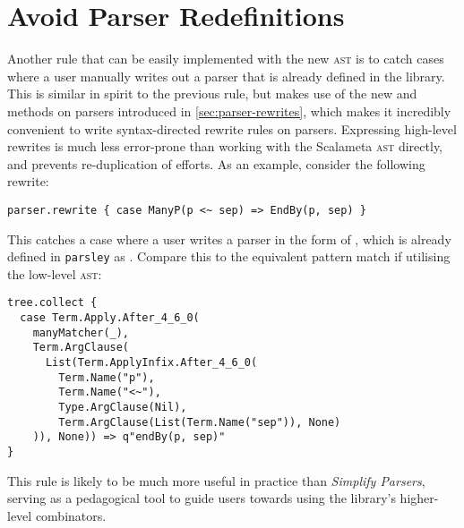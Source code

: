 \documentclass[../../main.tex]{subfiles}
\begin{document}
\section{Avoid Parser Redefinitions}\label{sec:avoid-redefinitions-rule}
Another rule that can be easily implemented with the new  \textsc{ast} is to catch cases where a user manually writes out a parser that is already defined in the library.
This is similar in spirit to the previous rule, but makes use of the new  and  methods on parsers introduced in \cref{sec:parser-rewrites}, which makes it incredibly convenient to write syntax-directed rewrite rules on parsers.
Expressing high-level rewrites is much less error-prone than working with the Scalameta \textsc{ast} directly, and prevents re-duplication of efforts.
As an example, consider the following rewrite:
\begin{verbatim}
parser.rewrite { case ManyP(p <~ sep) => EndBy(p, sep) }
\end{verbatim}
%
This catches a case where a user writes a parser in the form of , which is already defined in \texttt{parsley} as .
Compare this to the equivalent pattern match if utilising the low-level \textsc{ast}:
\begin{verbatim}
tree.collect {
  case Term.Apply.After_4_6_0(
    manyMatcher(_),
    Term.ArgClause(
      List(Term.ApplyInfix.After_4_6_0(
        Term.Name("p"),
        Term.Name("<~"),
        Type.ArgClause(Nil),
        Term.ArgClause(List(Term.Name("sep")), None)
    )), None)) => q"endBy(p, sep)"
}
\end{verbatim}
%
This rule is likely to be much more useful in practice than \emph{Simplify Parsers}, serving as a pedagogical tool to guide users towards using the library's higher-level combinators.


\end{document}
